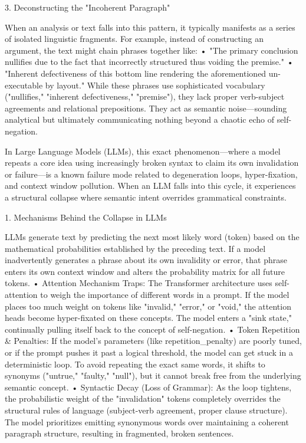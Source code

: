 3. Deconstructing the "Incoherent Paragraph"

When an analysis or text falls into this pattern, it typically manifests as a series of isolated linguistic fragments. For example, instead of constructing an argument, the text might chain phrases together like:
• "The primary conclusion nullifies due to the fact that incorrectly structured thus voiding the premise."
• "Inherent defectiveness of this bottom line rendering the aforementioned un-executable by layout."
While these phrases use sophisticated vocabulary ("nullifies," "inherent defectiveness," "premise"), they lack proper verb-subject agreements and relational prepositions. They act as semantic noise—sounding analytical but ultimately communicating nothing beyond a chaotic echo of self-negation.

In Large Language Models (LLMs), this exact phenomenon—where a model repeats a core idea using increasingly broken syntax to claim its own invalidation or failure—is a known failure mode related to degeneration loops, hyper-fixation, and context window pollution.
When an LLM falls into this cycle, it experiences a structural collapse where semantic intent overrides grammatical constraints.

1. Mechanisms Behind the Collapse in LLMs

LLMs generate text by predicting the next most likely word (token) based on the mathematical probabilities established by the preceding text. If a model inadvertently generates a phrase about its own invalidity or error, that phrase enters its own context window and alters the probability matrix for all future tokens.
• Attention Mechanism Traps: The Transformer architecture uses self-attention to weigh the importance of different words in a prompt. If the model places too much weight on tokens like "invalid," "error," or "void," the attention heads become hyper-fixated on these concepts. The model enters a "sink state," continually pulling itself back to the concept of self-negation.
• Token Repetition & Penalties: If the model's parameters (like repetition_penalty) are poorly tuned, or if the prompt pushes it past a logical threshold, the model can get stuck in a deterministic loop. To avoid repeating the exact same words, it shifts to synonyms ("untrue," "faulty," "null"), but it cannot break free from the underlying semantic concept.
• Syntactic Decay (Loss of Grammar): As the loop tightens, the probabilistic weight of the "invalidation" tokens completely overrides the structural rules of language (subject-verb agreement, proper clause structure). The model prioritizes emitting synonymous words over maintaining a coherent paragraph structure, resulting in fragmented, broken sentences.

